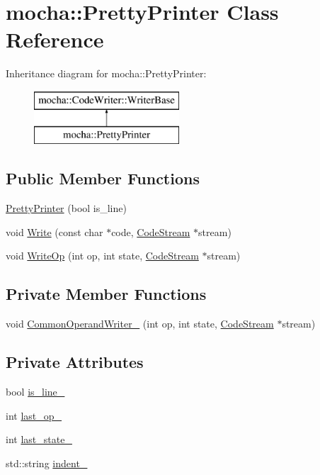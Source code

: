 \hypertarget{classmocha_1_1_pretty_printer}{
\section{mocha::PrettyPrinter Class Reference}
\label{classmocha_1_1_pretty_printer}
}
Inheritance diagram for mocha::PrettyPrinter:\begin{figure}[H]
\begin{center}
\leavevmode
\includegraphics[height=2.000000cm]{classmocha_1_1_pretty_printer}
\end{center}
\end{figure}
\subsection*{Public Member Functions}
\begin{DoxyCompactItemize}
\item 
\hyperlink{classmocha_1_1_pretty_printer_a06a715f096649ba7c93f3a9d7042147a}{PrettyPrinter} (bool is\_\-line)
\item 
void \hyperlink{classmocha_1_1_pretty_printer_ad494168e90d71f97ead31b6c613c9a46}{Write} (const char $\ast$code, \hyperlink{classmocha_1_1_code_stream}{CodeStream} $\ast$stream)
\item 
void \hyperlink{classmocha_1_1_pretty_printer_a55c5f0ad4f93a2b3459305864f7eca24}{WriteOp} (int op, int state, \hyperlink{classmocha_1_1_code_stream}{CodeStream} $\ast$stream)
\end{DoxyCompactItemize}
\subsection*{Private Member Functions}
\begin{DoxyCompactItemize}
\item 
void \hyperlink{classmocha_1_1_pretty_printer_ad3703eea22f27426db4b34b4b07a0d3a}{CommonOperandWriter\_\-} (int op, int state, \hyperlink{classmocha_1_1_code_stream}{CodeStream} $\ast$stream)
\end{DoxyCompactItemize}
\subsection*{Private Attributes}
\begin{DoxyCompactItemize}
\item 
bool \hyperlink{classmocha_1_1_pretty_printer_a8708ff8166e2017244fbb396a2688ebb}{is\_\-line\_\-}
\item 
int \hyperlink{classmocha_1_1_pretty_printer_a146a5110df5481164c5ad84a36fffe0c}{last\_\-op\_\-}
\item 
int \hyperlink{classmocha_1_1_pretty_printer_a50d07941880d3d2fc1fdf656ced16468}{last\_\-state\_\-}
\item 
std::string \hyperlink{classmocha_1_1_pretty_printer_a706e726a1c55482bbf3bd4e9706171c0}{indent\_\-}
\end{DoxyCompactItemize}
